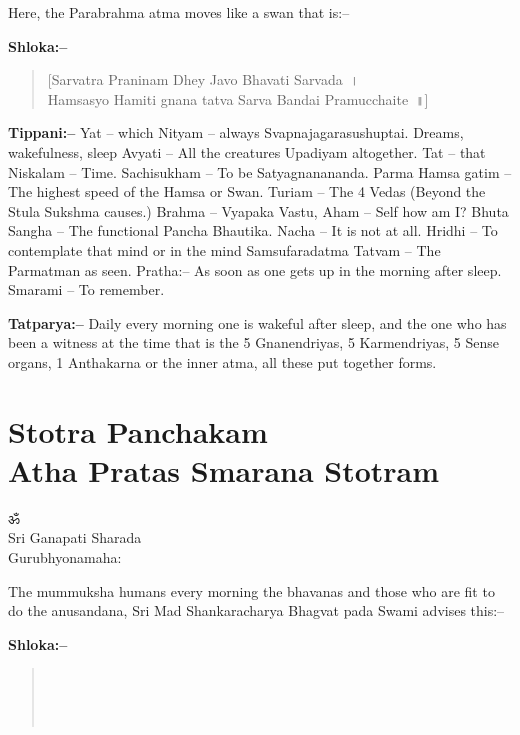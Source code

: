 Here, the Parabrahma atma moves like a swan that is:–

\textbf{Shloka:–}

\begin{verse}
 [Sarvatra Praninam Dhey Javo Bhavati Sarvada~।\\
 Hamsasyo Hamiti gnana tatva Sarva Bandai Pramucchaite~॥]
\end{verse}

\textbf{Tippani:–} Yat – which Nityam – always Svapnajagarasushuptai. Dreams, wakefulness, sleep Avyati – All the creatures Upadiyam altogether. Tat – that Niskalam – Time. Sachisukham – To be Satyagnanananda. Parma Hamsa gatim – The highest speed of the Hamsa or Swan. Turiam – The 4 Vedas (Beyond the Stula Sukshma causes.) Brahma – Vyapaka Vastu, Aham – Self how am I? Bhuta Sangha – The functional Pancha Bhautika. Nacha – It is not at all. Hridhi – To contemplate that mind or in the mind Samsufaradatma Tatvam – The Parmatman as seen. Pratha:– As soon as one gets up in the morning after sleep. Smarami – To remember.

\textbf{Tatparya:–} Daily every morning one is wakeful after sleep, and the one who has been a witness at the time that is the 5 Gnanendriyas, 5 Karmendriyas, 5 Sense organs, 1 Anthakarna or the inner atma, all these put together forms.

\chapter{Stotra Panchakam\\ Atha Pratas Smarana Stotram}

\begin{center}
ॐ\\ Sri Ganapati Sharada\\ Gurubhyonamaha:
\end{center}

The mummuksha humans every morning the bhavanas and those who are fit to do the anusandana, Sri Mad Shankaracharya Bhagvat pada Swami advises this:–

\textbf{Shloka:–}

\begin{verse}
 \\\\\\
\end{verse}

